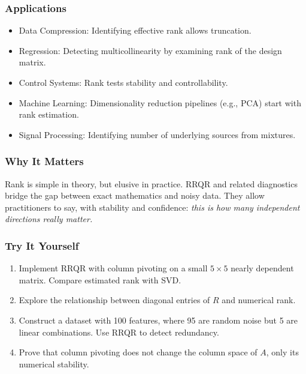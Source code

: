 \documentclass[
  letterpaper,
  DIV=11,
  numbers=noendperiod]{scrreprt}
\providecommand{\tightlist}{%
  \setlength{\itemsep}{0pt}\setlength{\parskip}{0pt}}
\begin{document}
\subsubsection{Applications}\label{applications-48}

\begin{itemize}
\tightlist
\item
  Data Compression: Identifying effective rank allows truncation.
\item
  Regression: Detecting multicollinearity by examining rank of the
  design matrix.
\item
  Control Systems: Rank tests stability and controllability.
\item
  Machine Learning: Dimensionality reduction pipelines (e.g., PCA) start
  with rank estimation.
\item
  Signal Processing: Identifying number of underlying sources from
  mixtures.
\end{itemize}

\subsubsection{Why It Matters}\label{why-it-matters-86}

Rank is simple in theory, but elusive in practice. RRQR and related
diagnostics bridge the gap between exact mathematics and noisy data.
They allow practitioners to say, with stability and confidence:
\emph{this is how many independent directions really matter.}

\subsubsection{Try It Yourself}\label{try-it-yourself-89}

\begin{enumerate}
\def\labelenumi{\arabic{enumi}.}
\tightlist
\item
  Implement RRQR with column pivoting on a small \(5 \times 5\) nearly
  dependent matrix. Compare estimated rank with SVD.
\item
  Explore the relationship between diagonal entries of \(R\) and
  numerical rank.
\item
  Construct a dataset with 100 features, where 95 are random noise but 5
  are linear combinations. Use RRQR to detect redundancy.
\item
  Prove that column pivoting does not change the column space of \(A\),
  only its numerical stability.
\end{enumerate}
\end{document}
